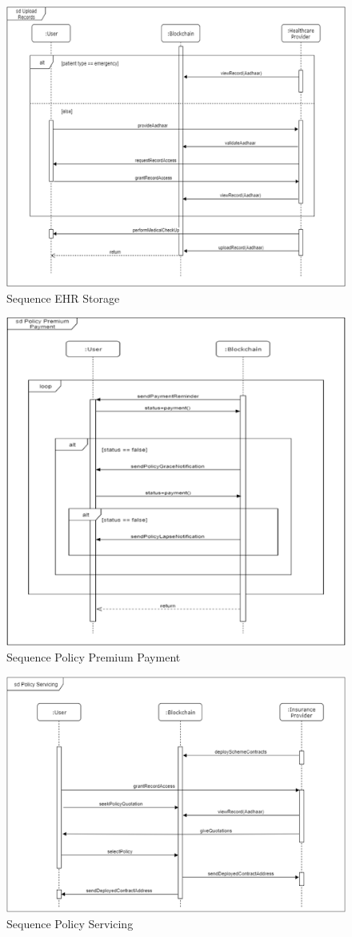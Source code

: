 \begin{figure}[!b]
	\centering
	\includegraphics[width=0.6\linewidth]{Images/UML/SequenceEHRStorage.png}
	\caption{ Sequence EHR Storage}
\end{figure}
\begin{figure}[!t]
	\centering
	\includegraphics[width=0.7\linewidth]{Images/UML/SequencePolicyPremiumPayment.png}
	\caption{ Sequence Policy Premium Payment}
\end{figure}
\begin{figure}[!b]
	\centering
	\includegraphics[width=0.7\linewidth]{Images/UML/SequencePolicyServicing.png}
	\caption{ Sequence Policy Servicing}
\end{figure}
